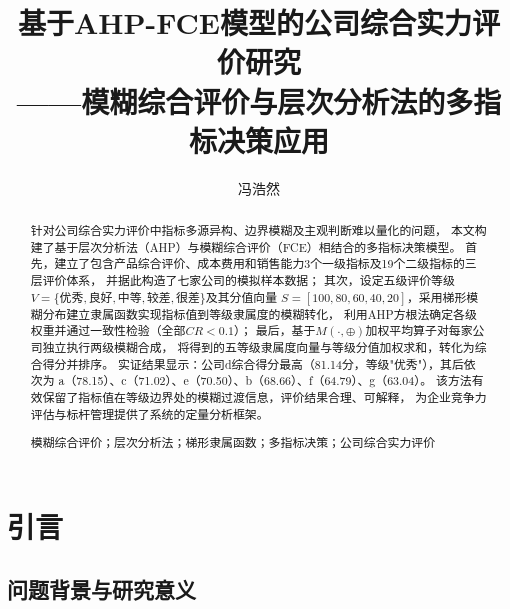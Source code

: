\documentclass[a4paper,12pt]{ctexart}
\begin{document}
\title{{\heiti{} 基于AHP-FCE模型的公司综合实力评价研究}\\[6pt]
       {\kaishu{} ——模糊综合评价与层次分析法的多指标决策应用}}
\author{{\kaishu{} 冯浩然}}
\date{}
\maketitle

\thispagestyle{empty}

\begin{abstract}
\noindent
针对公司综合实力评价中指标多源异构、边界模糊及主观判断难以量化的问题，
本文构建了基于层次分析法（AHP）与模糊综合评价（FCE）相结合的多指标决策模型。
首先，建立了包含产品综合评价、成本费用和销售能力3个一级指标及19个二级指标的三层评价体系，
并据此构造了七家公司的模拟样本数据；
其次，设定五级评价等级$V=\{\text{优秀},\text{良好},\text{中等},\text{较差},\text{很差}\}$及其分值向量
$S=[100,80,60,40,20]$，采用梯形模糊分布建立隶属函数实现指标值到等级隶属度的模糊转化，
利用AHP方根法确定各级权重并通过一致性检验（全部$CR<0.1$）；
最后，基于$M(\cdot,\oplus)$加权平均算子对每家公司独立执行两级模糊合成，
将得到的五等级隶属度向量与等级分值加权求和，转化为综合得分并排序。
实证结果显示：公司d综合得分最高（81.14分，等级"优秀"），其后依次为
a（78.15）、c（71.02）、e（70.50）、b（68.66）、f（64.79）、g（63.04）。
该方法有效保留了指标值在等级边界处的模糊过渡信息，评价结果合理、可解释，
为企业竞争力评估与标杆管理提供了系统的定量分析框架。

\vspace{0.8em}
 模糊综合评价；层次分析法；梯形隶属函数；多指标决策；公司综合实力评价
\end{abstract}

\section{引言}

\subsection{问题背景与研究意义}
\end{document}
